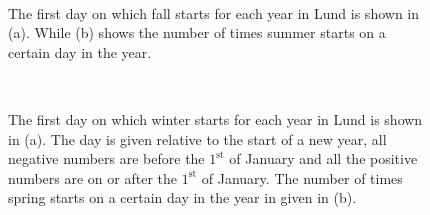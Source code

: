 \begin{figure}[ht!]
\centering
{} 
\\
\caption{The first day on which fall starts for each year in Lund is shown in (a).  While (b) shows the number of times summer starts on a certain day in the year.}
\label{fig:fall}
\end{figure}

\begin{figure}[ht!]
\centering
{} 
\\
\caption{The first day on which winter starts for each year in Lund is shown in (a). The day is given relative to the start of a new year, all negative numbers are before the $1^{\text{st}}$ of January and all the positive numbers are on or after the $1^\text{st}$ of January.  The number of times spring starts on a certain day in the year in given in (b).}
\label{fig:winter}
\end{figure}

















